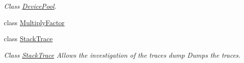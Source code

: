 \begin{DoxyCompactItemize}
\begin{DoxyCompactList}\small\item\em Class \hyperlink{classintel_1_1hexl_1_1fpga_1_1DevicePool}{Device\-Pool}. \end{DoxyCompactList}\item 
class \hyperlink{classintel_1_1hexl_1_1fpga_1_1MultiplyFactor}{Multiply\-Factor}
\item 
class \hyperlink{classintel_1_1hexl_1_1fpga_1_1StackTrace}{Stack\-Trace}
\begin{DoxyCompactList}\small\item\em Class \hyperlink{classintel_1_1hexl_1_1fpga_1_1StackTrace}{Stack\-Trace} Allows the investigation of the traces  dump Dumps the traces. \end{DoxyCompactList}\end{DoxyCompactItemize}

